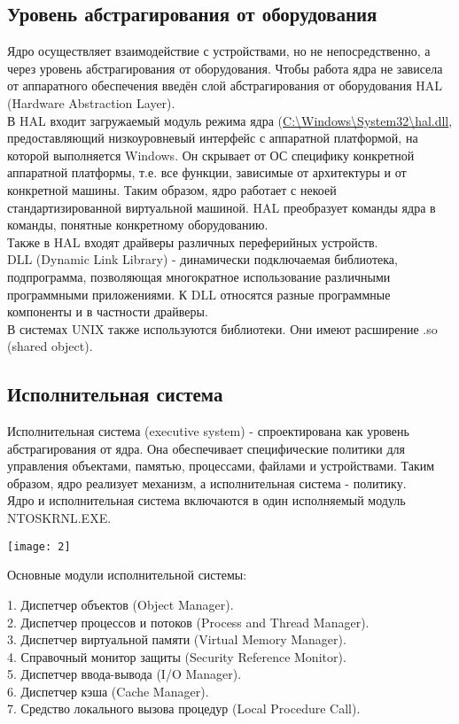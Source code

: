 \documentclass[a4paper]{article}
\begin{document}
\subsection{Уровень абстрагирования от оборудования}
Ядро осуществляет взаимодействие с устройствами, но не непосредственно, а через уровень абстрагирования от оборудования. Чтобы работа ядра не зависела от аппаратного обеспечения введён слой абстрагирования от оборудования HAL (Hardware Abstraction Layer).\\
В HAL входит загружаемый модуль режима ядра (\url{C:\Windows\System32\hal.dll}, предоставляющий низкоуровневый интерфейс с аппаратной платформой, на которой выполняется Windows. Он скрывает от ОС специфику конкретной аппаратной платформы, т.е. все функции, зависимые от архитектуры и от конкретной машины. Таким образом, ядро работает с некоей стандартизированной виртуальной машиной. HAL преобразует команды ядра в команды, понятные конкретному оборудованию.\\
Также в HAL входят драйверы различных переферийных устройств.\\
DLL (Dynamic Link Library) - динамически подключаемая библиотека, подпрограмма, позволяющая многократное использование различными программными приложениями. К DLL относятся разные программные компоненты и в частности драйверы.\\
В системах UNIX также используются библиотеки. Они имеют расширение .so (shared object).\\
\subsection{Исполнительная система}
Исполнительная система (executive system) - спроектирована как уровень абстрагирования от ядра. Она обеспечивает специфические политики для управления объектами, памятью, процессами, файлами и устройствами. Таким образом, ядро реализует механизм, а исполнительная система - политику.\\
Ядро и исполнительная система включаются в один исполняемый модуль NTOSKRNL.EXE.
\begin{center}
	\texttt{[image: 2]}
\end{center}
\begin{center}
Основные модули исполнительной системы:
\end{center}
1. Диспетчер объектов (Object Manager).\\
2. Диспетчер процессов и потоков (Process and Thread Manager).\\
3. Диспетчер виртуальной памяти (Virtual Memory Manager).\\
4. Справочный монитор защиты (Security Reference Monitor).\\
5. Диспетчер ввода-вывода (I/O Manager).\\
6. Диспетчер кэша (Cache Manager).\\
7. Средство локального вызова процедур (Local Procedure Call).\\
\end{document}

